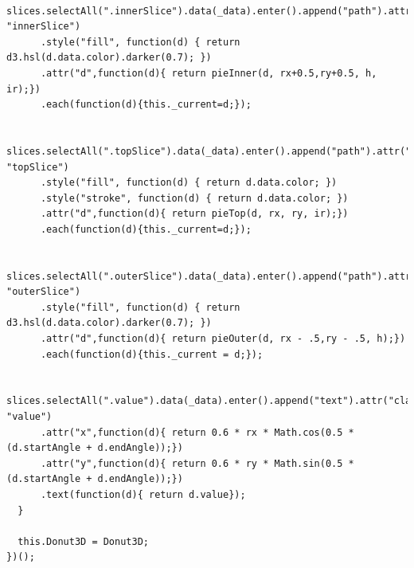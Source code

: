 \documentclass[a4paper,14pt]{extreport}
\begin{document}
\begin{lstlisting}
    slices.selectAll(".innerSlice").data(_data).enter().append("path").attr("class", "innerSlice")
      .style("fill", function(d) { return d3.hsl(d.data.color).darker(0.7); })
      .attr("d",function(d){ return pieInner(d, rx+0.5,ry+0.5, h, ir);})
      .each(function(d){this._current=d;});
    
    slices.selectAll(".topSlice").data(_data).enter().append("path").attr("class", "topSlice")
      .style("fill", function(d) { return d.data.color; })
      .style("stroke", function(d) { return d.data.color; })
      .attr("d",function(d){ return pieTop(d, rx, ry, ir);})
      .each(function(d){this._current=d;});
    
    slices.selectAll(".outerSlice").data(_data).enter().append("path").attr("class", "outerSlice")
      .style("fill", function(d) { return d3.hsl(d.data.color).darker(0.7); })
      .attr("d",function(d){ return pieOuter(d, rx - .5,ry - .5, h);})
      .each(function(d){this._current = d;});

    slices.selectAll(".value").data(_data).enter().append("text").attr("class", "value")
      .attr("x",function(d){ return 0.6 * rx * Math.cos(0.5 * (d.startAngle + d.endAngle));})
      .attr("y",function(d){ return 0.6 * ry * Math.sin(0.5 * (d.startAngle + d.endAngle));})
      .text(function(d){ return d.value});        
  }
  
  this.Donut3D = Donut3D;
})();
\end{lstlisting}
\end{document}
